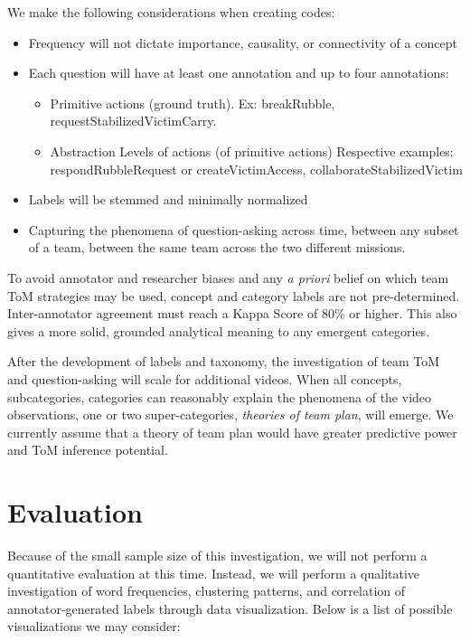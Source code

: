 \documentclass[10pt]{article}
\begin{document}
We make the following considerations when creating codes: 

\begin{itemize}
    \item Frequency will not dictate importance, causality, or connectivity of a concept
    \item Each question will have at least one annotation and up to four
      annotations:
    \begin{itemize}
        \item Primitive actions (ground truth). Ex: breakRubble,
          requestStabilizedVictimCarry.
        \item Abstraction Levels of actions (of primitive actions) Respective
          examples: respondRubbleRequest or createVictimAccess, collaborateStabilizedVictim
    \end{itemize}
    \item Labels will be stemmed and minimally normalized
    \item Capturing the phenomena of question-asking across time, between any subset of a team, between the same team across the two different missions. 
\end{itemize}


To avoid annotator and researcher biases and any \emph{a priori} belief on
which team ToM strategies may be used, concept and category labels are not
pre-determined. Inter-annotator agreement must reach a Kappa Score of 80\% or
higher. This also gives a more solid, grounded analytical meaning to any
emergent categories. 

After the development of labels and taxonomy, the investigation of team ToM and
question-asking will scale for additional videos. When all concepts,
subcategories, categories can reasonably explain the phenomena of the video
observations, one or two super-categories, \emph{theories of team plan}, will
emerge. We currently assume that a theory of team plan would have greater
predictive power and ToM inference potential. 


\section{Evaluation}

Because of the small sample size of this investigation, we will not perform a
quantitative evaluation at this time. Instead, we will perform a qualitative
investigation of word frequencies, clustering patterns, and correlation of
annotator-generated labels through data visualization. Below is a list of
possible visualizations we may consider:
\end{document}
